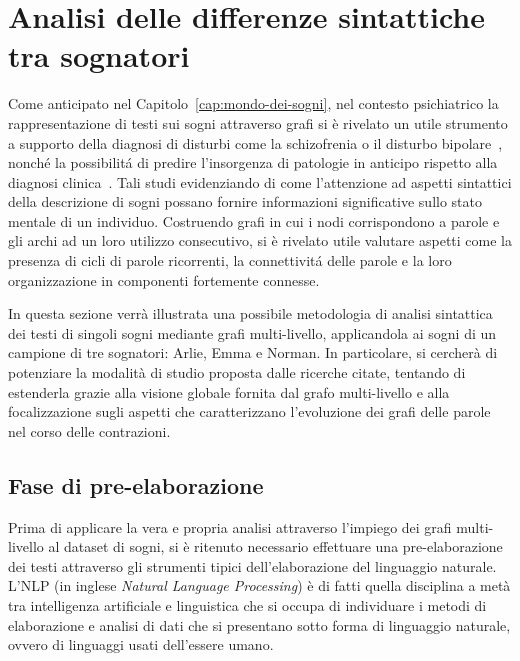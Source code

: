 \section{Analisi delle differenze sintattiche tra sognatori} \label{sec:analisi-delle-differenze-sintattiche-tra-sognatori}

Come anticipato nel Capitolo~\ref{cap:mondo-dei-sogni}, nel contesto psichiatrico la rappresentazione di testi sui
sogni attraverso grafi si \`e rivelato un utile strumento a supporto della diagnosi di disturbi come la schizofrenia
o il disturbo bipolare~\cite{mota2014graph}, nonch\'e la possibilit\'a di predire l'insorgenza di patologie in
anticipo rispetto alla diagnosi clinica~\cite{mota2017thought}.
Tali studi evidenziando di come l'attenzione ad aspetti sintattici della descrizione di sogni possano fornire
informazioni significative sullo stato mentale di un individuo. Costruendo grafi in cui i nodi corrispondono a parole
e gli archi ad un loro utilizzo consecutivo, si è rivelato utile valutare aspetti come la presenza di cicli di parole
ricorrenti, la connettivit\'a delle parole e la loro organizzazione in componenti fortemente connesse.

In questa sezione verrà illustrata una possibile metodologia di analisi sintattica dei testi di singoli sogni mediante
grafi multi-livello, applicandola ai sogni di un campione di tre sognatori: Arlie, Emma e Norman.
In particolare, si cercherà di potenziare la modalità di studio proposta dalle ricerche citate, tentando di estenderla
grazie alla visione globale fornita dal grafo multi-livello e alla focalizzazione sugli aspetti che caratterizzano
l'evoluzione dei grafi delle parole nel corso delle contrazioni.

\subsection{Fase di pre-elaborazione}\label{subec:pre-elaborazione-con-NLP}
Prima di applicare la vera e propria analisi attraverso l'impiego dei grafi multi-livello al dataset di sogni, si è
ritenuto necessario effettuare una pre-elaborazione dei testi attraverso gli strumenti tipici dell'elaborazione del
linguaggio naturale.
L'NLP (in inglese \textit{Natural Language Processing}) è di fatti quella disciplina a metà tra intelligenza artificiale
e linguistica che si occupa di individuare i metodi di elaborazione e analisi di dati che si presentano sotto forma di
linguaggio naturale, ovvero di linguaggi usati dell'essere umano. \newline

